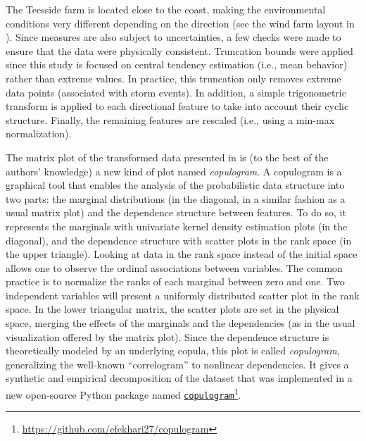 The Teesside farm is located close to the coast, making the environmental conditions very different depending on the direction (see the wind farm layout in ). 
Since measures are also subject to uncertainties, a few checks were made to ensure that the data were physically consistent. 
Truncation bounds were applied since this study is focused on central tendency estimation (i.e., mean behavior) rather than extreme values. 
In practice, this truncation only removes extreme data points (associated with storm events). 
In addition, a simple trigonometric transform is applied to each directional feature to take into account their cyclic structure. 
Finally, the remaining features are rescaled (i.e., using a min-max normalization). 

The matrix plot of the transformed data presented in  is (to the best of the authors' knowledge) a new kind of plot named \emph{copulogram}. 
A copulogram is a graphical tool that enables the analysis of the probabilistic data structure into two parts: the marginal distributions (in the diagonal, in a similar fashion as a usual matrix plot) and the dependence structure between features. 
To do so, it represents the marginals with univariate kernel density estimation plots (in the diagonal), and the dependence structure with scatter plots in the rank space (in the upper triangle). 
Looking at data in the rank space instead of the initial space allows one to observe the ordinal associations between variables. 
The common practice is to normalize the ranks of each marginal between zero and one. 
Two independent variables will present a uniformly distributed scatter plot in the rank space. 
In the lower triangular matrix, the scatter plots are set in the physical space, merging the effects of the marginals and the dependencies (as in the usual visualization offered by the matrix plot). 
Since the dependence structure is theoretically modeled by an underlying copula, this plot is called \emph{copulogram}, generalizing the well-known ``correlogram'' to nonlinear dependencies. 
It gives a synthetic and empirical decomposition of the dataset that was implemented in a new open-source Python package named \texttt{\href{https://github.com/efekhari27/copulogram}{copulogram}}\footnote{\url{https://github.com/efekhari27/copulogram}}.

